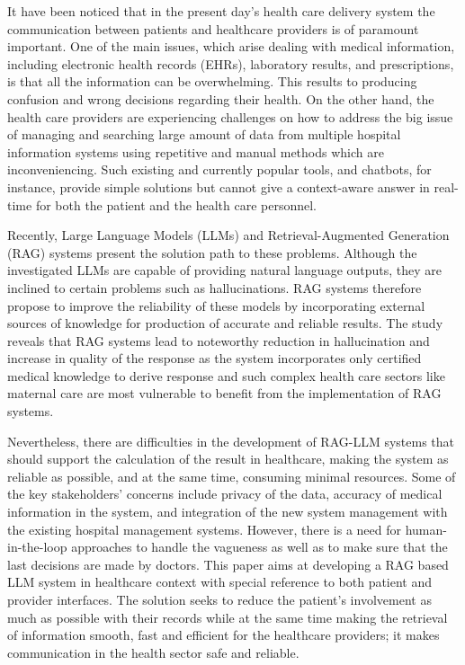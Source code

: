 It have been noticed that in the present day's health care delivery system the communication between patients and healthcare providers is of paramount important. One of the main issues, which arise dealing with medical information, including electronic health records (EHRs), laboratory results, and prescriptions, is that all the information can be overwhelming. This results to producing confusion and wrong decisions regarding their health. On the other hand, the health care providers are experiencing challenges on how to address the big issue of managing and searching large amount of data from multiple hospital information systems using repetitive and manual methods which are inconveniencing. Such existing and currently popular tools, and chatbots, for instance, provide simple solutions but cannot give a context-aware answer in real-time for both the patient and the health care personnel.

Recently, Large Language Models (LLMs) and Retrieval-Augmented Generation (RAG) systems present the solution path to these problems. Although the investigated LLMs are capable of providing natural language outputs, they are inclined to certain problems such as hallucinations. RAG systems therefore propose to improve the reliability of these models by incorporating external sources of knowledge for production of accurate and reliable results. The study reveals that RAG systems lead to noteworthy reduction in hallucination and increase in quality of the response as the system incorporates only certified medical knowledge to derive response and such complex health care sectors like maternal care are most vulnerable to benefit from the implementation of RAG systems.

Nevertheless, there are difficulties in the development of RAG-LLM systems that should support the calculation of the result in healthcare, making the system as reliable as possible, and at the same time, consuming minimal resources. Some of the key stakeholders' concerns include privacy of the data, accuracy of medical information in the system, and integration of the new system management with the existing hospital management systems. However, there is a need for human-in-the-loop approaches to handle the vagueness as well as to make sure that the last decisions are made by doctors. This paper aims at developing a RAG based LLM system in healthcare context with special reference to both patient and provider interfaces. The solution seeks to reduce the patient's involvement as much as possible with their records while at the same time making the retrieval of information smooth, fast and efficient for the healthcare providers; it makes communication in the health sector safe and reliable.